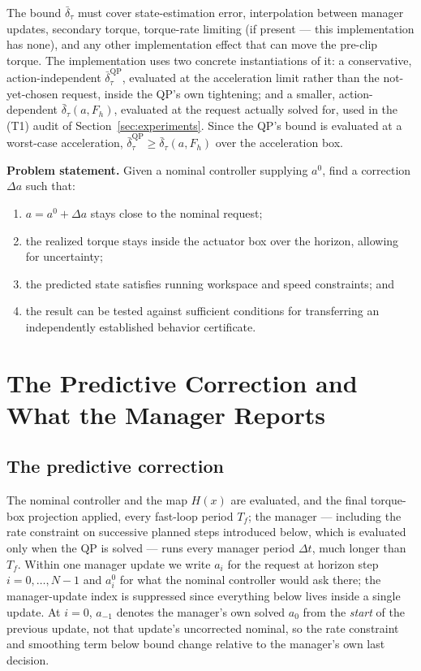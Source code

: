 \documentclass[journal]{IEEEtran}
\begin{document}
The bound $\bar\delta_\tau$ must cover state-estimation error, interpolation between manager updates, secondary torque, torque-rate limiting (if present --- this implementation has none), and any other implementation effect that can move the pre-clip torque. The implementation uses two concrete instantiations of it: a conservative, action-independent $\bar\delta_\tau^{\mathrm{QP}}$, evaluated at the acceleration limit rather than the not-yet-chosen request, inside the QP's own tightening; and a smaller, action-dependent $\bar\delta_\tau(a,F_h)$, evaluated at the request actually solved for, used in the (T1) audit of Section~\ref{sec:experiments}. Since the QP's bound is evaluated at a worst-case acceleration, $\bar\delta_\tau^{\mathrm{QP}}\ge\bar\delta_\tau(a,F_h)$ over the acceleration box.

\textbf{Problem statement.} Given a nominal controller supplying $a^{0}$, find a correction $\Delta a$ such that:
\begin{enumerate}
\item $a=a^{0}+\Delta a$ stays close to the nominal request;
\item the realized torque stays inside the actuator box over the horizon, allowing for uncertainty;
\item the predicted state satisfies running workspace and speed constraints; and
\item the result can be tested against sufficient conditions for transferring an independently established behavior certificate.
\end{enumerate}

\section{The Predictive Correction and What the Manager Reports}
\label{sec:correction}

\subsection{The predictive correction}
\label{sec:predictivecorrection}

The nominal controller and the map $H(x)$ are evaluated, and the final torque-box projection applied, every fast-loop period $T_f$; the manager --- including the rate constraint on successive planned steps introduced below, which is evaluated only when the QP is solved --- runs every manager period $\Delta t$, much longer than $T_f$. Within one manager update we write $a_i$ for the request at horizon step $i=0,\dots,N-1$ and $a^0_i$ for what the nominal controller would ask there; the manager-update index is suppressed since everything below lives inside a single update. At $i=0$, $a_{-1}$ denotes the manager's own solved $a_0$ from the \emph{start} of the previous update, not that update's uncorrected nominal, so the rate constraint and smoothing term below bound change relative to the manager's own last decision.
\end{document}

